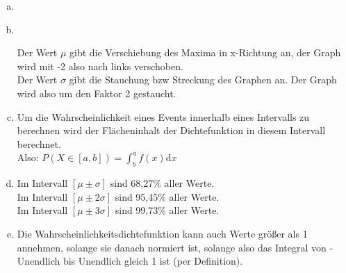 \begin{enumerate}[a)]
	\item $ $\\
	\begin{center}
	\end{center}\newpage
	\item $ $\\
	\begin{center}
	\end{center}
	Der Wert $\mu$ gibt die Verschiebung des Maxima in x-Richtung an, der Graph wird mit -2 also nach links verschoben.\\
	Der Wert $\sigma$ gibt die Stauchung bzw Streckung des Graphen an. Der Graph wird also um den Faktor 2 gestaucht.\\
	\item Um die Wahrscheinlichkeit eines Events innerhalb eines Intervalls zu berechnen wird der Flächeninhalt der Dichtefunktion in diesem Intervall berechnet. \\
	Also: $P(X\in[a,b])=\int^a_bf(x)\text{d}x$
	\item Im Intervall $[\mu\pm\sigma]$ sind 68,27$\%$ aller Werte.\\
	Im Intervall $[\mu\pm2\sigma]$ sind 95,45$\%$ aller Werte.\\
	Im Intervall $[\mu\pm3\sigma]$ sind 99,73$\%$ aller Werte.\\
	\item Die Wahrscheinlichkeitsdichtefunktion kann auch Werte größer als 1 annehmen, solange sie danach normiert ist, solange also das Integral von - Unendlich bis Unendlich gleich 1 ist (per Definition).
\end{enumerate}